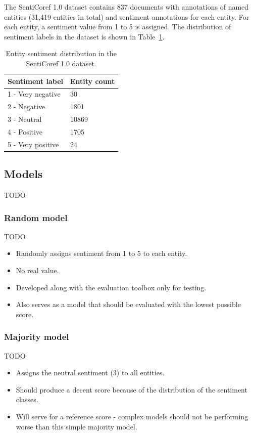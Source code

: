 \documentclass[11pt,a4paper]{article}
\begin{document}
The SentiCoref 1.0 dataset contains 837 documents with annotations of named entities (31,419 entities in total) and sentiment annotations for each entity. For each entity, a sentiment value from 1 to 5 is assigned. The distribution of sentiment labels in the dataset is shown in Table~\ref{tab:sentiment_distribution}.

\begin{table}[h]
\centering
\begin{tabular}{ll}
Sentiment label   & Entity count \\ \hline
1 - Very negative & 30           \\
2 - Negative      & 1801         \\
3 - Neutral       & 10869        \\
4 - Positive      & 1705         \\
5 - Very positive & 24          
\end{tabular}
\caption{Entity sentiment distribution in the SentiCoref 1.0 dataset.}
\label{tab:sentiment_distribution}
\end{table}

\subsection{Models}

TODO

\subsubsection{Random model}

TODO
\begin{itemize}
    \item Randomly assigns sentiment from 1 to 5 to each entity.
    \item No real value.
    \item Developed along with the evaluation toolbox only for testing.
    \item Also serves as a model that should be evaluated with the lowest possible score.
\end{itemize}

\subsubsection{Majority model}

TODO
\begin{itemize}
    \item Assigns the neutral sentiment (3) to all entities.
    \item Should produce a decent score because of the distribution of the sentiment classes.
    \item Will serve for a reference score - complex models should not be performing worse than this simple majority model.
\end{itemize}
\end{document}
